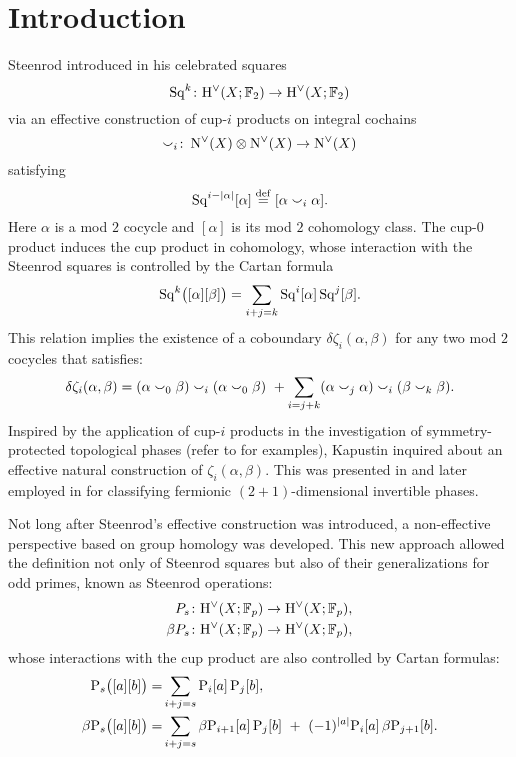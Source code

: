 
\section{Introduction} \label{s:introduction}

Steenrod introduced in \cite{steenrod1947products} his celebrated squares
\begin{equation*}
	\operatorname{Sq}^k \colon \mathrm{H}^\vee(X; {\mathbb{F}_2}) \to \mathrm{H}^\vee(X; {\mathbb{F}_2})
\end{equation*}
via an effective construction of cup-$i$ products on integral cochains
\[
\smallsmile_i \colon \operatorname{N^{\vee}}(X) \otimes \operatorname{N^{\vee}}(X) \to \operatorname{N^{\vee}}(X)
\]
satisfying
\[
\operatorname{Sq}^{i-\lvert\alpha\rvert}[\alpha] \stackrel{\mathrm{def}}{=} [\alpha \smallsmile_i \alpha].
\]
Here $\alpha$ is a mod $2$ cocycle and $[\alpha]$ is its mod $2$ cohomology class.
The cup-$0$ product induces the cup product in cohomology, whose interaction with the Steenrod squares is controlled by the Cartan formula
\[
\operatorname{Sq}^k\!\big([\alpha] [\beta]\big) = \sum_{i+j=k} \operatorname{Sq}^i [\alpha] \operatorname{Sq}^j[\beta].
\]
This relation implies the existence of a coboundary $\delta\zeta_i(\alpha,\beta)$ for any two mod $2$ cocycles that satisfies:
\begin{equation}\label{e:lift cartan even}
	\delta\zeta_i(\alpha, \beta) =
	(\alpha \smallsmile_0 \beta) \smallsmile_i (\alpha \smallsmile_0 \beta) \ +
	\sum_{i=j+k} (\alpha \smallsmile_j \alpha) \smallsmile_i (\beta \smallsmile_k \beta).
\end{equation}
Inspired by the application of cup-$i$ products in the investigation of symmetry-protected topological phases (refer to \cite{kapustin2015cobordism, gaiotto2016spin, kapustin2017fermionic} for examples), Kapustin inquired about an effective natural construction of $\zeta_i(\alpha, \beta)$.
This was presented in \cite{medina2020cartan} and later employed in \cite{barkeshli2021classification} for classifying fermionic $(2+1)$-dimensional invertible phases.

Not long after Steenrod's effective construction was introduced, a non-effective perspective based on group homology was developed.
This new approach allowed the definition not only of Steenrod squares but also of their generalizations for odd primes, known as Steenrod operations:
\begin{align*}
	P_s \colon& \mathrm{H}^\vee(X; {\mathbb{F}_p}) \to \mathrm{H}^\vee(X; {\mathbb{F}_p}), \\
	\beta P_s \colon& \mathrm{H}^\vee(X; {\mathbb{F}_p}) \to \mathrm{H}^\vee(X; {\mathbb{F}_p}),
\end{align*}
whose interactions with the cup product are also controlled by Cartan formulas:
\begin{align*}
	\mathrm{P}_s\big([a][b]\big) =&
	\sum_{i+j=s} \mathrm{P}_i[a] \, \mathrm{P}_j[b], \\
	\beta\mathrm{P}_s\big([a][b]\big) =&
	\sum_{i+j=s} \beta\mathrm{P}_{i+1}[a] \, \mathrm{P}_j[b] \ +\ (-1)^{\lvert a\rvert} \mathrm{P}_i[a] \, \beta\mathrm{P}_{j+1}[b].
\end{align*}

